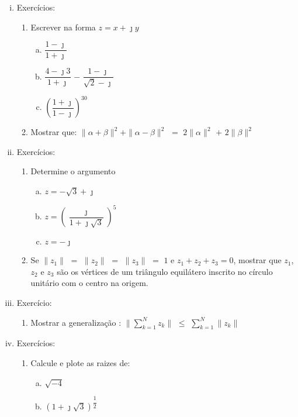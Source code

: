 \begin{enumerate}[i.]
  \item Exercícios:
    \begin{enumerate}[1.]
    \item Escrever na forma $z = x + \jmath y$
      \begin{enumerate}[a)]
      \item $\dfrac{1 - \jmath}{1 + \jmath}$
      \item $\dfrac{4 - \jmath 3}{1 + \jmath}$ $-$ $\dfrac{1 - \jmath}{\sqrt{2} - \jmath}$
      \item $\left(\dfrac{1 + \jmath}{1 - \jmath}\right)^{30}$
      \end{enumerate}
    \item Mostrar que: $\|\alpha + \beta \|^{2} + \|\alpha - \beta \|^{2}$ $=$ $2\|\alpha\|^{2}$ $+$ $2\|\beta\|^{2}$
    \end{enumerate}
  \item Exercícios:
    \begin{enumerate}[1.]
    \item Determine o argumento
      \begin{enumerate}[a)]
      \item $z = - \sqrt{3} + \jmath$
      \item $z = \left(\dfrac{\jmath}{1 + \jmath \sqrt{3}}\right)^{5}$
      \item $z = - \jmath$
      \end{enumerate}
    \item Se $\|z_{1}\|$ $=$ $\|z_{2}\|$ $=$ $\|z_{3}\|$ $=$ $1$ e $z_{1} + z_{2} + z_{3} = 0$, mostrar que $z_{1}$, $z_{2}$ e $z_{3}$ são os vértices de um triângulo equilátero inscrito no círculo unitário com o centro na origem.
    \end{enumerate}
  \item Exercício:
    \begin{enumerate}[1.]
      \item Mostrar a generalização : $\displaystyle \|\sum^{N}_{k = 1} z_{k}\|$ $\leq$ $\displaystyle \sum^{N}_{k = 1} \|z_{k}\|$
    \end{enumerate}
  \item Exercícios:
    \begin{enumerate}[1.]
      \item Calcule e plote as raizes de:
        \begin{enumerate}[a)]
          \item $\sqrt{-4}$
          \item $\left(1 + \jmath \sqrt{3}\right)^{\dfrac{1}{2}}$

\end{enumerate}
\end{enumerate}
\end{enumerate}
